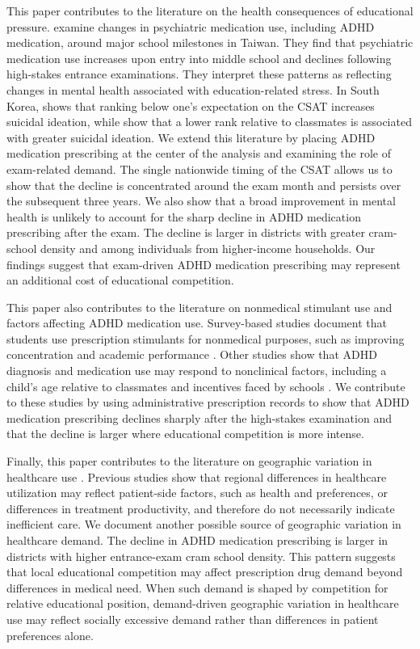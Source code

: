 \documentclass[12pt]{article}
\begin{document}
This paper contributes to the literature on the health consequences of educational pressure. \citet{chen2026} examine changes in psychiatric medication use, including ADHD medication, around major school milestones in Taiwan. They find that psychiatric medication use increases upon entry into middle school and declines following high-stakes entrance examinations. They interpret these patterns as reflecting changes in mental health associated with education-related stress. In South Korea, \citet{wang2016} shows that ranking below one's expectation on the CSAT increases suicidal ideation, while \citet{fawaz2022} show that a lower rank relative to classmates is associated with greater suicidal ideation. We extend this literature by placing ADHD medication prescribing at the center of the analysis and examining the role of exam-related demand. The single nationwide timing of the CSAT allows us to show that the decline is concentrated around the exam month and persists over the subsequent three years. We also show that a broad improvement in mental health is unlikely to account for the sharp decline in ADHD medication prescribing after the exam. The decline is larger in districts with greater cram-school density and among individuals from higher-income households. Our findings suggest that exam-driven ADHD medication prescribing may represent an additional cost of educational competition.

This paper also contributes to the literature on nonmedical stimulant use and factors affecting ADHD medication use. Survey-based studies document that students use prescription stimulants for nonmedical purposes, such as improving concentration and academic performance \citep{mccabe2005,desantis2008,rabiner2009}. Other studies show that ADHD diagnosis and medication use may respond to nonclinical factors, including a child's age relative to classmates and incentives faced by schools \citep{elder2010,evans2010,bokhari2011,morrill2018}. We contribute to these studies by using administrative prescription records to show that ADHD medication prescribing declines sharply after the high-stakes examination and that the decline is larger where educational competition is more intense.

Finally, this paper contributes to the literature on geographic variation in healthcare use \citep{chandra2007,finkelstein2016}. Previous studies show that regional differences in healthcare utilization may reflect patient-side factors, such as health and preferences, or differences in treatment productivity, and therefore do not necessarily indicate inefficient care. We document another possible source of geographic variation in healthcare demand. The decline in ADHD medication prescribing is larger in districts with higher entrance-exam cram school density. This pattern suggests that local educational competition may affect prescription drug demand beyond differences in medical need. When such demand is shaped by competition for relative educational position, demand-driven geographic variation in healthcare use may reflect socially excessive demand rather than differences in patient preferences alone.
\end{document}

